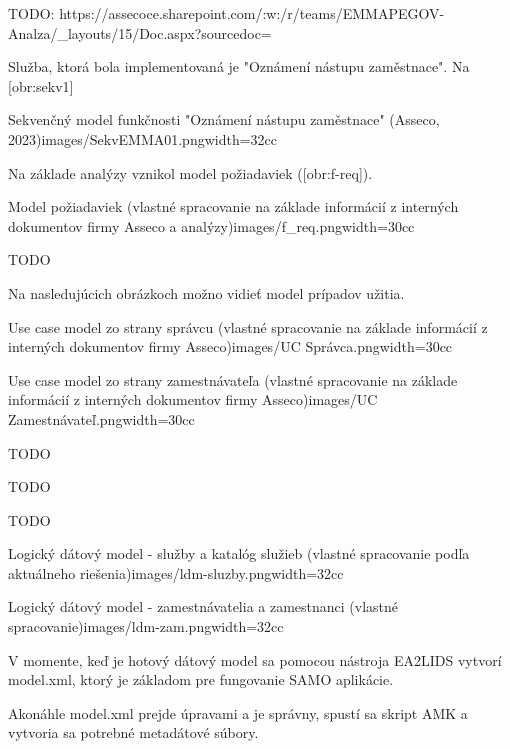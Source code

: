 TODO: 
https://assecoce.sharepoint.com/:w:/r/teams/EMMAPEGOV-Analza/_layouts/15/Doc.aspx?sourcedoc=%

Služba, ktorá bola implementovaná je "Oznámení nástupu zaměstnace". Na [obr:sekv1]

{Sekvenčný model funkčnosti "Oznámení nástupu zaměstnace" (Asseco, 2023)}{images/SekvEMMA01.png}{width=32cc}

Na základe analýzy vznikol model požiadaviek ([obr:f-req]).

{Model požiadaviek (vlastné spracovanie na základe informácií z interných dokumentov firmy Asseco a analýzy)}{images/f_req.png}{width=30cc}

\TODO
TODO

Na nasledujúcich obrázkoch možno vidieť model prípadov užitia.

{Use case model zo strany správcu (vlastné spracovanie na základe informácií z interných dokumentov firmy Asseco)}{images/UC Správca.png}{width=30cc}

{Use case model zo strany zamestnávateľa (vlastné spracovanie na základe informácií z interných dokumentov firmy Asseco)}{images/UC Zamestnávateľ.png}{width=30cc}


\TODO
TODO


\TODO
TODO


\TODO 
TODO


{Logický dátový model - služby a katalóg služieb (vlastné spracovanie podľa aktuálneho riešenia)}{images/ldm-sluzby.png}{width=32cc}

{Logický dátový model - zamestnávatelia a zamestnanci (vlastné spracovanie)}{images/ldm-zam.png}{width=32cc}

V momente, keď je hotový dátový model sa pomocou nástroja EA2LIDS vytvorí model.xml, ktorý je základom pre fungovanie SAMO aplikácie. 

Akonáhle model.xml prejde úpravami a je správny, spustí sa skript AMK a vytvoria sa potrebné metadátové súbory. 

